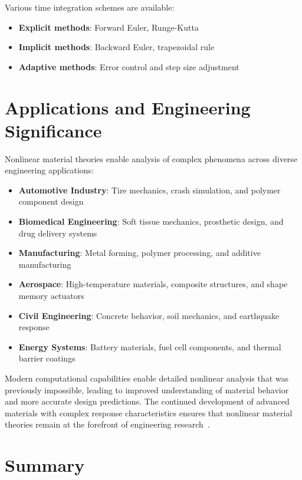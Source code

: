Various time integration schemes are available:
\begin{itemize}
\item \textbf{Explicit methods}: Forward Euler, Runge-Kutta
\item \textbf{Implicit methods}: Backward Euler, trapezoidal rule
\item \textbf{Adaptive methods}: Error control and step size adjustment
\end{itemize}

\section{Applications and Engineering Significance}

Nonlinear material theories enable analysis of complex phenomena across diverse engineering applications:

\begin{itemize}
\item \textbf{Automotive Industry}: Tire mechanics, crash simulation, and polymer component design
\item \textbf{Biomedical Engineering}: Soft tissue mechanics, prosthetic design, and drug delivery systems
\item \textbf{Manufacturing}: Metal forming, polymer processing, and additive manufacturing
\item \textbf{Aerospace}: High-temperature materials, composite structures, and shape memory actuators
\item \textbf{Civil Engineering}: Concrete behavior, soil mechanics, and earthquake response
\item \textbf{Energy Systems}: Battery materials, fuel cell components, and thermal barrier coatings
\end{itemize}

Modern computational capabilities enable detailed nonlinear analysis that was previously impossible, leading to improved understanding of material behavior and more accurate design predictions. The continued development of advanced materials with complex response characteristics ensures that nonlinear material theories remain at the forefront of engineering research~\autocite{Sadd.2019}.

\section{Summary}

